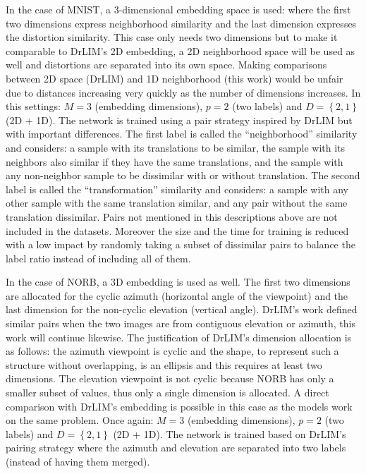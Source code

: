 \documentclass[a4paper,12pt]{report}
\begin{document}
In the case of MNIST, a 3-dimensional embedding space is used: where the first two dimensions express neighborhood similarity and the last dimension expresses the distortion similarity.
This case only needs two dimensions but to make it comparable to DrLIM's 2D embedding, a 2D neighborhood space will be used as well and distortions are separated into its own space.
Making comparisons between 2D space (DrLIM) and 1D neighborhood (this work) would be unfair due to distances increasing very quickly as the number of dimensions increases.
In this settings: $M=3$ (embedding dimensions), $p = 2$ (two labels) and $D = \left\{ 2, 1 \right\}$ (2D + 1D).
The network is trained using a pair strategy inspired by DrLIM but with important differences.
The first label is called the ``neighborhood'' similarity and considers: a sample with its translations to be similar, the sample with its neighbors also similar if they have the same translations, and the sample with any non-neighbor sample to be dissimilar with or without translation.
The second label is called the ``transformation'' similarity and considers: a sample with any other sample with the same translation similar, and any pair without the same translation dissimilar.
Pairs not mentioned in this descriptions above are not included in the datasets.
Moreover the size and the time for training is reduced with a low impact by randomly taking a subset of dissimilar pairs to balance the label ratio instead of including all of them.

In the case of NORB, a 3D embedding is used as well.
The first two dimensions are allocated for the cyclic azimuth (horizontal angle of the viewpoint) and the last dimension for the non-cyclic elevation (vertical angle).
DrLIM's work defined similar pairs when the two images are from contiguous elevation or azimuth, this work will continue likewise.
The justification of DrLIM's dimension allocation is as follows: the azimuth viewpoint is cyclic and the shape, to represent such a structure without overlapping, is an ellipsis and this requires at least two dimensions.
The elevation viewpoint is not cyclic because NORB has only a smaller subset of values, thus only a single dimension is allocated.
A direct comparison with DrLIM's embedding is possible in this case as the models work on the same problem.
Once again: $M=3$ (embedding dimensions), $p = 2$ (two labels) and $D = \left\{ 2, 1 \right\}$ (2D + 1D).
The network is trained based on DrLIM's pairing strategy where the azimuth and elevation are separated into two labels (instead of having them merged).
\end{document}
